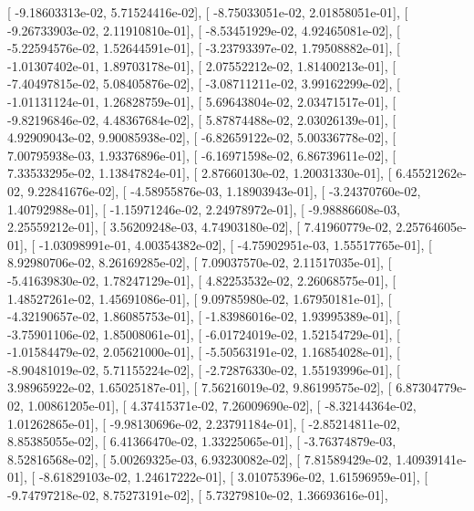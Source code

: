 \documentclass{article}
\begin{document}
       [ -9.18603313e-02,   5.71524416e-02],
       [ -8.75033051e-02,   2.01858051e-01],
       [ -9.26733903e-02,   2.11910810e-01],
       [ -8.53451929e-02,   4.92465081e-02],
       [ -5.22594576e-02,   1.52644591e-01],
       [ -3.23793397e-02,   1.79508882e-01],
       [ -1.01307402e-01,   1.89703178e-01],
       [  2.07552212e-02,   1.81400213e-01],
       [ -7.40497815e-02,   5.08405876e-02],
       [ -3.08711211e-02,   3.99162299e-02],
       [ -1.01131124e-01,   1.26828759e-01],
       [  5.69643804e-02,   2.03471517e-01],
       [ -9.82196846e-02,   4.48367684e-02],
       [  5.87874488e-02,   2.03026139e-01],
       [  4.92909043e-02,   9.90085938e-02],
       [ -6.82659122e-02,   5.00336778e-02],
       [  7.00795938e-03,   1.93376896e-01],
       [ -6.16971598e-02,   6.86739611e-02],
       [  7.33533295e-02,   1.13847824e-01],
       [  2.87660130e-02,   1.20031330e-01],
       [  6.45521262e-02,   9.22841676e-02],
       [ -4.58955876e-03,   1.18903943e-01],
       [ -3.24370760e-02,   1.40792988e-01],
       [ -1.15971246e-02,   2.24978972e-01],
       [ -9.98886608e-03,   2.25559212e-01],
       [  3.56209248e-03,   4.74903180e-02],
       [  7.41960779e-02,   2.25764605e-01],
       [ -1.03098991e-01,   4.00354382e-02],
       [ -4.75902951e-03,   1.55517765e-01],
       [  8.92980706e-02,   8.26169285e-02],
       [  7.09037570e-02,   2.11517035e-01],
       [ -5.41639830e-02,   1.78247129e-01],
       [  4.82253532e-02,   2.26068575e-01],
       [  1.48527261e-02,   1.45691086e-01],
       [  9.09785980e-02,   1.67950181e-01],
       [ -4.32190657e-02,   1.86085753e-01],
       [ -1.83986016e-02,   1.93995389e-01],
       [ -3.75901106e-02,   1.85008061e-01],
       [ -6.01724019e-02,   1.52154729e-01],
       [ -1.01584479e-02,   2.05621000e-01],
       [ -5.50563191e-02,   1.16854028e-01],
       [ -8.90481019e-02,   5.71155224e-02],
       [ -2.72876330e-02,   1.55193996e-01],
       [  3.98965922e-02,   1.65025187e-01],
       [  7.56216019e-02,   9.86199575e-02],
       [  6.87304779e-02,   1.00861205e-01],
       [  4.37415371e-02,   7.26009690e-02],
       [ -8.32144364e-02,   1.01262865e-01],
       [ -9.98130696e-02,   2.23791184e-01],
       [ -2.85214811e-02,   8.85385055e-02],
       [  6.41366470e-02,   1.33225065e-01],
       [ -3.76374879e-03,   8.52816568e-02],
       [  5.00269325e-03,   6.93230082e-02],
       [  7.81589429e-02,   1.40939141e-01],
       [ -8.61829103e-02,   1.24617222e-01],
       [  3.01075396e-02,   1.61596959e-01],
       [ -9.74797218e-02,   8.75273191e-02],
       [  5.73279810e-02,   1.36693616e-01],
\end{document}
